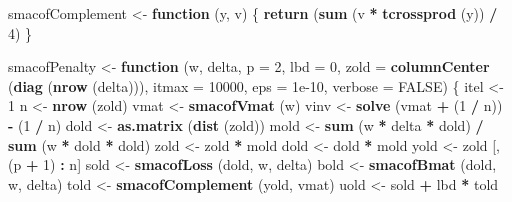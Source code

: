 \documentclass[
  12pt,
]{article}
\newenvironment{Shaded}{\begin{snugshade}}{\end{snugshade}}
\newcommand{\AttributeTok}[1]{\textcolor[rgb]{0.13,0.29,0.53}{#1}}
\newcommand{\ConstantTok}[1]{\textcolor[rgb]{0.56,0.35,0.01}{#1}}
\newcommand{\ControlFlowTok}[1]{\textcolor[rgb]{0.13,0.29,0.53}{\textbf{#1}}}
\newcommand{\DecValTok}[1]{\textcolor[rgb]{0.00,0.00,0.81}{#1}}
\newcommand{\FloatTok}[1]{\textcolor[rgb]{0.00,0.00,0.81}{#1}}
\newcommand{\FunctionTok}[1]{\textcolor[rgb]{0.13,0.29,0.53}{\textbf{#1}}}
\newcommand{\NormalTok}[1]{#1}
\newcommand{\OtherTok}[1]{\textcolor[rgb]{0.56,0.35,0.01}{#1}}
\newcommand{\SpecialCharTok}[1]{\textcolor[rgb]{0.81,0.36,0.00}{\textbf{#1}}}
\begin{document}
\begin{Shaded}
\begin{Highlighting}[]
\NormalTok{smacofComplement }\OtherTok{\textless{}{-}} \ControlFlowTok{function}\NormalTok{ (y, v) \{}
  \FunctionTok{return}\NormalTok{ (}\FunctionTok{sum}\NormalTok{ (v }\SpecialCharTok{*} \FunctionTok{tcrossprod}\NormalTok{ (y)) }\SpecialCharTok{/} \DecValTok{4}\NormalTok{)}
\NormalTok{\}}

\NormalTok{smacofPenalty }\OtherTok{\textless{}{-}}
  \ControlFlowTok{function}\NormalTok{ (w,}
\NormalTok{            delta,}
            \AttributeTok{p =} \DecValTok{2}\NormalTok{,}
            \AttributeTok{lbd =} \DecValTok{0}\NormalTok{,}
            \AttributeTok{zold =} \FunctionTok{columnCenter}\NormalTok{ (}\FunctionTok{diag}\NormalTok{ (}\FunctionTok{nrow}\NormalTok{ (delta))),}
            \AttributeTok{itmax =} \DecValTok{10000}\NormalTok{,}
            \AttributeTok{eps =} \FloatTok{1e{-}10}\NormalTok{,}
            \AttributeTok{verbose =} \ConstantTok{FALSE}\NormalTok{) \{}
\NormalTok{    itel }\OtherTok{\textless{}{-}} \DecValTok{1}
\NormalTok{    n }\OtherTok{\textless{}{-}} \FunctionTok{nrow}\NormalTok{ (zold)}
\NormalTok{    vmat }\OtherTok{\textless{}{-}} \FunctionTok{smacofVmat}\NormalTok{ (w)}
\NormalTok{    vinv }\OtherTok{\textless{}{-}} \FunctionTok{solve}\NormalTok{ (vmat }\SpecialCharTok{+}\NormalTok{ (}\DecValTok{1} \SpecialCharTok{/}\NormalTok{ n)) }\SpecialCharTok{{-}}\NormalTok{ (}\DecValTok{1} \SpecialCharTok{/}\NormalTok{ n)}
\NormalTok{    dold }\OtherTok{\textless{}{-}} \FunctionTok{as.matrix}\NormalTok{ (}\FunctionTok{dist}\NormalTok{ (zold))}
\NormalTok{    mold }\OtherTok{\textless{}{-}} \FunctionTok{sum}\NormalTok{ (w }\SpecialCharTok{*}\NormalTok{ delta }\SpecialCharTok{*}\NormalTok{ dold) }\SpecialCharTok{/} \FunctionTok{sum}\NormalTok{ (w }\SpecialCharTok{*}\NormalTok{ dold }\SpecialCharTok{*}\NormalTok{ dold)}
\NormalTok{    zold }\OtherTok{\textless{}{-}}\NormalTok{ zold }\SpecialCharTok{*}\NormalTok{ mold}
\NormalTok{    dold }\OtherTok{\textless{}{-}}\NormalTok{ dold }\SpecialCharTok{*}\NormalTok{ mold}
\NormalTok{    yold }\OtherTok{\textless{}{-}}\NormalTok{ zold [, (p }\SpecialCharTok{+} \DecValTok{1}\NormalTok{) }\SpecialCharTok{:}\NormalTok{ n]}
\NormalTok{    sold }\OtherTok{\textless{}{-}} \FunctionTok{smacofLoss}\NormalTok{ (dold, w, delta)}
\NormalTok{    bold }\OtherTok{\textless{}{-}} \FunctionTok{smacofBmat}\NormalTok{ (dold, w, delta)}
\NormalTok{    told }\OtherTok{\textless{}{-}} \FunctionTok{smacofComplement}\NormalTok{ (yold, vmat)}
\NormalTok{    uold }\OtherTok{\textless{}{-}}\NormalTok{ sold }\SpecialCharTok{+}\NormalTok{ lbd }\SpecialCharTok{*}\NormalTok{ told}

\end{Highlighting}
\end{Shaded}
\end{document}
